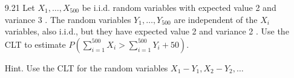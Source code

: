 \documentclass[10pt]{article}
\begin{document}
\begin{itemize}
(b) Answer part (a) again with the extra knowledge that $\operatorname{Var}\left(X_{i}\right)=\$ 4500$.

(c) Continue to assume that for all $i$ we have $E\left[X_{i}\right]=5000$ and $\operatorname{Var}\left(X_{i}\right)=4500$. Assuming that the amount earned on any given day is independent of the earning on other days, how many days does the cart have to be on State Street to ensure, with a probability at least 0.95 , that the cart's average earnings would be between $\$ 4950$ and $\$ 5050$. (Do not use the central limit theorem for this problem.)

\newpage
  \item[9.21]  Let $X_{1}, \ldots, X_{500}$ be i.i.d. random variables with expected value 2 and variance 3 . The random variables $Y_{1}, \ldots, Y_{500}$ are independent of the $X_{i}$ variables, also i.i.d., but they have expected value 2 and variance 2 . Use the CLT to estimate $P\left(\sum_{i=1}^{500} X_{i}>\sum_{i=1}^{500} Y_{i}+50\right)$.

Hint. Use the CLT for the random variables $X_{1}-Y_{1}, X_{2}-Y_{2}, \ldots$

\end{itemize}
\end{document}
